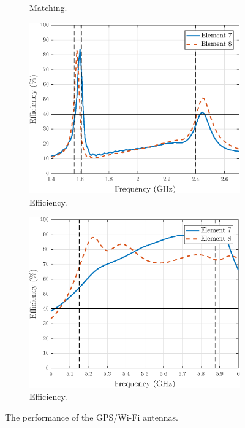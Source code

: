 \begin{figure}[H]
\begin{subfigure}[b]{0.48\textwidth}
        \caption{Matching.}
        \label{fig:wifihi_match}
    \end{subfigure}
    
    \begin{subfigure}[b]{0.48\textwidth}
        \includegraphics[width=\textwidth]{img/wifilow_eff_wgps.eps}
        \caption{Efficiency.}
        \label{fig:wifilow_eff}
    \end{subfigure}
    \begin{subfigure}[b]{0.48\textwidth}
        \includegraphics[width=\textwidth]{img/wifihi_eff_wgps.eps}
        \caption{Efficiency.}
        \label{fig:wifihi_eff}
    \end{subfigure}
    \vspace{-7pt}
    \caption{The performance of the GPS/Wi-Fi antennas.}
    \label{fig:gpswifi_perf}
    \vspace{-10pt}
\end{figure}


